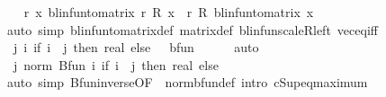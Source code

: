\begin{isabellebody}
\isamarkupfalse%
\isanewline
\ \ \isamarkupfalse%
\ {\isachardoublequoteopen}{\isasymAnd}r\ x{\isachardot}{\kern0pt}\ blinfun{\isacharunderscore}{\kern0pt}to{\isacharunderscore}{\kern0pt}matrix\ {\isacharparenleft}{\kern0pt}r\ {\isacharasterisk}{\kern0pt}\isactrlsub R\ x{\isacharparenright}{\kern0pt}\ {\isacharequal}{\kern0pt}\ r\ {\isacharasterisk}{\kern0pt}\isactrlsub R\ blinfun{\isacharunderscore}{\kern0pt}to{\isacharunderscore}{\kern0pt}matrix\ x{\isachardoublequoteclose}\isanewline
\ \ \ \ \isamarkupfalse%
\ {\isacharparenleft}{\kern0pt}auto\ simp{\isacharcolon}{\kern0pt}\ blinfun{\isacharunderscore}{\kern0pt}to{\isacharunderscore}{\kern0pt}matrix{\isacharunderscore}{\kern0pt}def\ matrix{\isacharunderscore}{\kern0pt}def\ blinfun{\isachardot}{\kern0pt}scaleR{\isacharunderscore}{\kern0pt}left\ vec{\isacharunderscore}{\kern0pt}eq{\isacharunderscore}{\kern0pt}iff{\isacharparenright}{\kern0pt}\isanewline
{}\isamarkupfalse%
\isanewline
\ \ \isamarkupfalse%
\ {\isacharasterisk}{\kern0pt}{\isacharcolon}{\kern0pt}\ {\isachardoublequoteopen}{\isasymAnd}j{\isachardot}{\kern0pt}\ {\isacharparenleft}{\kern0pt}{\isasymlambda}i{\isachardot}{\kern0pt}\ if\ i\ {\isacharequal}{\kern0pt}\ j\ then\ {}{\isacharcolon}{\kern0pt}{\isacharcolon}{\kern0pt}real\ else\ {}{\isacharparenright}{\kern0pt}\ {\isasymin}\ bfun{\isachardoublequoteclose}\isanewline
\ \ \ \ \isamarkupfalse%
\ auto\isanewline
\ \ \isamarkupfalse%
\ {\isacharasterisk}{\kern0pt}{\isacharasterisk}{\kern0pt}{\isacharcolon}{\kern0pt}\ {\isachardoublequoteopen}{\isasymAnd}j{\isachardot}{\kern0pt}\ norm\ {\isacharparenleft}{\kern0pt}Bfun\ {\isacharparenleft}{\kern0pt}{\isasymlambda}i{\isachardot}{\kern0pt}\ if\ i\ {\isacharequal}{\kern0pt}\ j\ then\ {}{\isacharcolon}{\kern0pt}{\isacharcolon}{\kern0pt}real\ else\ {}{\isacharparenright}{\kern0pt}{\isacharparenright}{\kern0pt}\ {\isacharequal}{\kern0pt}\ {}{\isachardoublequoteclose}\isanewline
\ \ \ \ \isamarkupfalse%
\ {\isacharparenleft}{\kern0pt}auto\ simp{\isacharcolon}{\kern0pt}\ Bfun{\isacharunderscore}{\kern0pt}inverse{\isacharbrackleft}{\kern0pt}OF\ {\isacharasterisk}{\kern0pt}{\isacharbrackright}{\kern0pt}\ norm{\isacharunderscore}{\kern0pt}bfun{\isacharunderscore}{\kern0pt}def{\isacharprime}{\kern0pt}\ intro{\isacharbang}{\kern0pt}{\isacharcolon}{\kern0pt}\ cSup{\isacharunderscore}{\kern0pt}eq{\isacharunderscore}{\kern0pt}maximum\ {\isacharparenright}{\kern0pt}\isanewline

\end{isabellebody}
